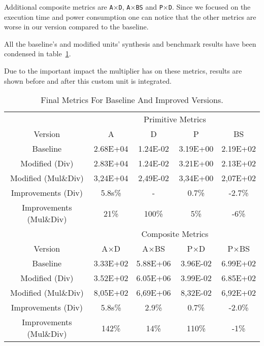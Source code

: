 Additional composite metrics are \texttt{A$\times$D}, \texttt{A$\times$BS} and \texttt{P$\times$D}. Since we focused on the
execution time and power consumption one can notice that the other metrics are worse in our version
compared to the baseline.

All the baseline's and modified units' synthesis and benchmark results have been condensed in table~\ref{tbl:final_metrics}.

 Due to the important impact the multiplier has on these metrics, results are shown before and after this custom unit is integrated.

\begin{table}[H]
\centering
\begin{tabular}{ccccc}

&
\multicolumn{4}{c}{Primitive Metrics}\\
Version &
\ttfamily A &
\ttfamily D &
\ttfamily P &
\ttfamily BS \\
Baseline &
\num{2.68E+04} &
\num{1.24E-02} &
\num{3.19E+00} &
\num{2.19E+02} \\
Modified (Div)&
\num{2.83E+04} &
\num{1.24E-02} &
\num{3.21E+00} &
\num{2.13E+02} \\
Modified (Mul\&Div)&
\num{3,24E+04} &
\num{2,49E-02} &
\num{3,34E+00} &
\num{2,07E+02} \\
Improvements (Div) &
\color{red} 5.8s\% &
- &
\color{red} 0.7\% &
\color{green} -2.7\% \\
Improvements (Mul\&Div) &
\color{red} 21\% &
\color{red} 100\% &
\color{red} 5\% &
\color{green} -6\% \\

\midrule

& \multicolumn{4}{c}{Composite Metrics}\\
Version &
\ttfamily A$\times$D &
\ttfamily A$\times$BS &
\ttfamily P$\times$D &
\ttfamily P$\times$BS\\
Baseline &
\num{3.33E+02} &
\num{5.88E+06} &
\num{3.96E-02} &
\num{6.99E+02} \\
Modified (Div)&
\num{3.52E+02} &
\num{6.05E+06} &
\num{3.99E-02} &
\num{6.85E+02} \\
Modified (Mul\&Div)&
\num{8,05E+02} &
\num{6,69E+06} &
\num{8,32E-02} &
\num{6,92E+02} \\
Improvements (Div) &
\color{red} 5.8s\% &
\color{red} 2.9\% &
\color{red} 0.7\% &
\color{green} -2.0\% \\
Improvements (Mul\&Div)&
\color{red} 142\% &
\color{red} 14\% &
\color{red} 110\% &
\color{green} -1\%\\
\end{tabular}
\caption{Final Metrics For Baseline And Improved Versions.}
\label{tbl:final_metrics}
\end{table}